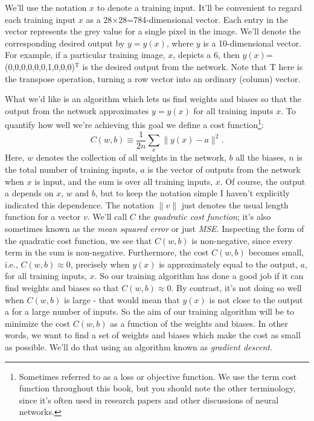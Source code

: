 We'll use the notation $x$ to denote a training input. It'll be convenient to regard each training input $x$ as a 28$\times$28=784-dimensional vector. Each entry in the vector represents the grey value for a single pixel in the image. We'll denote the corresponding desired output by $y=y(x)$, where $y$ is a 10-dimensional vector. For example, if a particular training image, $x$, depicts a 6, then $y(x)$=(0,0,0,0,0,0,1,0,0,0)$^\textrm{T}$ is the desired output from the network. Note that T here is the transpose operation, turning a row vector into an ordinary (column) vector.

What we'd like is an algorithm which lets us find weights and biases so that the output from the network approximates $y=y(x)$ for all training inputs $x$. To quantify how well we're achieving this goal we define a cost function\footnote{Sometimes referred to as a loss or objective function. We use the term cost function throughout this book, but you should note the other terminology, since it's often used in research papers and other discussions of neural networks.}:
\begin{equation}
C(w, b) \equiv \frac{1}{2 n} \sum_{x}\parallel y(x)-a\parallel ^{2}.
\label{eq:MSEcostfunction}
\end{equation}
Here, $w$ denotes the collection of all weights in the network, $b$ all the biases, $n$ is the total number of training inputs, $a$ is the vector of outputs from the network when $x$ is input, and the sum is over all training inputs, $x$. Of course, the output a depends on $x$, $w$ and $b$, but to keep the notation simple I haven't explicitly indicated this dependence. The notation $\parallel v\parallel$ just denotes the usual length function for a vector $v$. We'll call $C$ the \textit{quadratic cost function}; it's also sometimes known as the \textit{mean squared error} or just \textit{MSE}. Inspecting the form of the quadratic cost function, we see that $C(w,b)$ is non-negative, since every term in the sum is non-negative. Furthermore, the cost $C(w,b)$ becomes small, i.e., $C(w,b)\approx 0$, precisely when $y(x)$ is approximately equal to the output, $a$, for all training inputs, $x$. So our training algorithm has done a good job if it can find weights and biases so that $C(w,b)\approx 0$. By contrast, it's not doing so well when $C(w,b)$ is large - that would mean that $y(x)$ is not close to the output a for a large number of inputs. So the aim of our training algorithm will be to minimize the cost $C(w,b)$ as a function of the weights and biases. In other words, we want to find a set of weights and biases which make the cost as small as possible. We'll do that using an algorithm known as \textit{gradient descent}.

